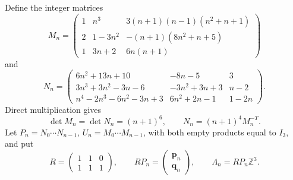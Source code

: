\documentclass[11pt,a4paper]{article}
\numberwithin{equation}{section}
\theoremstyle{definition}
\theoremstyle{remark}
\newcommand{\Z}{\mathbb Z}
\begin{document}
Define the integer matrices
\[
 M_n=
 \begin{pmatrix}
 1&n^3&3(n+1)(n-1)(n^2+n+1)\\
 2&1-3n^2&-(n+1)(8n^2+n+5)\\
 1&3n+2&6n(n+1)
 \end{pmatrix}
\]
and
\[
 N_n=
 \begin{pmatrix}
 6n^2+13n+10&-8n-5&3\\
 3n^3+3n^2-3n-6&-3n^2+3n+3&n-2\\
 n^4-2n^3-6n^2-3n+3&6n^2+2n-1&1-2n
 \end{pmatrix}.
\]
Direct multiplication gives
\begin{equation}\label{ga:matrix-relations}
 \det M_n=\det N_n=(n+1)^6,\qquad
 N_n=(n+1)^4M_n^{-T}.
\end{equation}
Let $P_n=N_0\cdots N_{n-1}$, $U_n=M_0\cdots M_{n-1}$,
with both empty products equal to $I_3$, and put
\[
 R=\begin{pmatrix}1&1&0\\1&1&1\end{pmatrix},\qquad
 RP_n=\begin{pmatrix}\mathbf p_n\\\mathbf q_n\end{pmatrix},
 \qquad \Lambda_n=RP_n\Z^3.
\]
\end{document}
